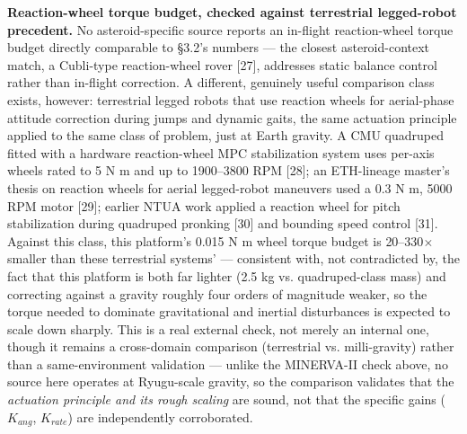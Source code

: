 \documentclass[conference]{IEEEtran}
\begin{document}
\textbf{Reaction-wheel torque budget, checked against terrestrial legged-robot precedent.} No asteroid-specific source reports an in-flight reaction-wheel torque budget directly comparable to \S3.2's numbers --- the closest asteroid-context match, a Cubli-type reaction-wheel rover [27], addresses static balance control rather than in-flight correction. A different, genuinely useful comparison class exists, however: terrestrial legged robots that use reaction wheels for aerial-phase attitude correction during jumps and dynamic gaits, the same actuation principle applied to the same class of problem, just at Earth gravity. A CMU quadruped fitted with a hardware reaction-wheel MPC stabilization system uses per-axis wheels rated to 5 N\,\textperiodcentered\,m and up to 1900--3800 RPM [28]; an ETH-lineage master's thesis on reaction wheels for aerial legged-robot maneuvers used a 0.3 N\,\textperiodcentered\,m, 5000 RPM motor [29]; earlier NTUA work applied a reaction wheel for pitch stabilization during quadruped pronking [30] and bounding speed control [31]. Against this class, this platform's 0.015 N\,\textperiodcentered\,m wheel torque budget is 20--330$\times$ smaller than these terrestrial systems' --- consistent with, not contradicted by, the fact that this platform is both far lighter (2.5 kg vs. quadruped-class mass) and correcting against a gravity roughly four orders of magnitude weaker, so the torque needed to dominate gravitational and inertial disturbances is expected to scale down sharply. This is a real external check, not merely an internal one, though it remains a cross-domain comparison (terrestrial vs. milli-gravity) rather than a same-environment validation --- unlike the MINERVA-II check above, no source here operates at Ryugu-scale gravity, so the comparison validates that the \emph{actuation principle and its rough scaling} are sound, not that the specific gains ($K_{ang}$, $K_{rate}$) are independently corroborated.
\end{document}
